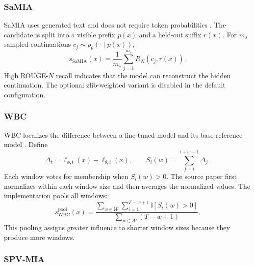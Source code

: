 \documentclass[11pt]{article}
\newcommand{\ind}{\mathbb{I}}
\begin{document}
\subsubsection{SaMIA}

SaMIA uses generated text and does not require token probabilities \citep{kaneko2024sampling}. The candidate is split into a visible prefix $p(x)$ and a held-out suffix $r(x)$. For $m_s$ sampled continuations $c_j\sim p_\theta(\cdot\mid p(x))$,
\begin{equation}
    s_{\mathrm{SaMIA}}(x)=\frac{1}{m_s}\sum_{j=1}^{m_s}R_N(c_j,r(x)).
    \label{eq:samia}
\end{equation}
High ROUGE-$N$ recall indicates that the model can reconstruct the hidden continuation. The optional zlib-weighted variant is disabled in the default configuration.

\subsubsection{WBC}

WBC localizes the difference between a fine-tuned model and its base reference model \citep{chen2026window}. Define
\begin{equation}
    \Delta_t=\ell_{\phi,t}(x)-\ell_{\theta,t}(x),
    \qquad
    S_i(w)=\sum_{j=i}^{i+w-1}\Delta_j.
\end{equation}
Each window votes for membership when $S_i(w)>0$. The source paper first normalizes within each window size and then averages the normalized values. The implementation pools all windows:
\begin{equation}
    s_{\mathrm{WBC}}^{\mathrm{pool}}(x)=
    \frac{\sum_{w\in\mathcal W}\sum_{i=1}^{T-w+1}\ind[S_i(w)>0]}
         {\sum_{w\in\mathcal W}(T-w+1)}.
    \label{eq:wbc}
\end{equation}
This pooling assigns greater influence to shorter window sizes because they produce more windows.

\subsubsection{SPV-MIA}
\end{document}
